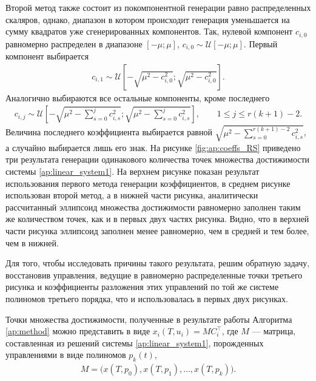 \documentclass[../main.tex]{subfiles}
\begin{document}
  Второй метод также состоит из покомпонентной генерации равно распределенных скаляров, однако, диапазон в котором происходит генерация уменьшается на сумму квадратов уже сгенерированных компонентов.   
  Так, нулевой компонент $c_{i, 0}$ равномерно распределен в диапазоне $[-\mu; \mu]$, $c_{i, 0} \sim \mathcal{U}[-\mu; \mu]$. 
  Первый компонент выбирается 
  \begin{gather*}
  	 c_{i, 1} \sim \mathcal{U}\left[-\sqrt{\mu^2 - c_{i, 0}^2}; \sqrt{\mu^2 - c_{i, 0}^2}\right].
  \end{gather*} 
  Аналогично выбираются все остальные компоненты, кроме последнего
    \begin{gather*}
  	c_{i, j} \sim \mathcal{U}\left[-\sqrt{\mu^2 - \sum\limits_{s = 0}^j c_{i, s}^2}; \sqrt{\mu^2 - \sum\limits_{s = 0}^j c_{i, s}^2}\right], \qquad 1 \leqslant j \leqslant r(k+1) - 2.
  \end{gather*} 
  Величина последнего коэффициента выбирается равной $\sqrt{\mu^2 - \sum\limits_{s = 0}^{r(k+1) - 2} c_{i, s}^2} $, а случайно выбирается лишь его знак.
  На рисунке \ref{fig:ap:coeffs_RS} приведено три результата генерации одинакового количества точек множества достижимости системы \eqref{ap:linear_system1}.
  На верхнем рисунке показан результат использования первого метода генерации коэффициентов, в среднем рисунке использован второй метод, а в нижней части рисунка, аналитически рассчитанный эллипсоид множества достижимости равномерно заполнен таким же количеством точек, как и в первых двух частях рисунка. 
  Видно, что в верхней части рисунка эллипсоид заполнен менее равномерно, чем в средней и тем более, чем в нижней. 
  
  Для того, чтобы исследовать причины такого результата, решим обратную задачу, восстановив управления, ведущие в равномерно распределенные точки третьего рисунка и коэффициенты разложения этих управлений по той же системе полиномов третьего порядка, что и использовалась в первых двух рисунках.
  
  Точки множества достижимости, полученные в результате работы Алгоритма \ref{ap:method} можно представить в виде $x_i(T, u_i) = M C_i^{\top}$, где $M$ --- матрица, составленная из решений системы \eqref{ap:linear_system1}, порожденных управлениями в виде полиномов $p_k(t)$, 
  \begin{gather}\label{ap:matrix_M}
  	 M = \big(x(T, p_0), x(T, p_1), \dots, x(T, p_k)\big).
  \end{gather} 
  
\end{document}
